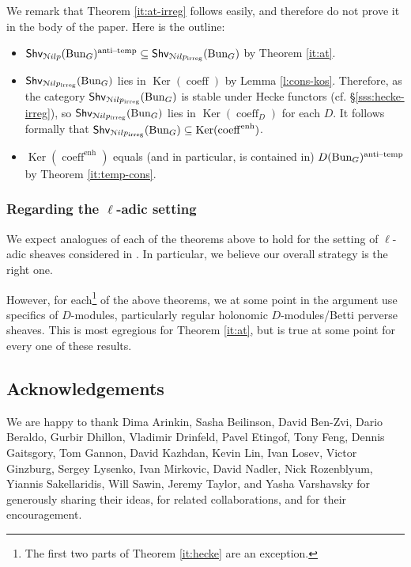 \documentclass[reqno,11pt]{amsart}
\numberwithin{equation}{subsection}
\theoremstyle{remark}
\newcommand{\sN}{{\EuScript N}}
\newcommand{\on}{\operatorname}
\newcommand{\mathendash}{\text{\textendash}}
\newcommand{\Ker}{\on{Ker}}
\newcommand{\Bun}{\on{Bun}}
\renewcommand{\subset}{\subseteq}
\newcommand{\coeff}{\on{coeff}}
\newcommand{\enh}{\on{enh}}
\newcommand{\Shv}{\mathsf{Shv}}
\newcommand{\at}{\on{anti}\!\mathendash\!\on{temp}}
\newcommand{\Nilp}{\sN ilp}
\newcommand{\irreg}{\on{irreg}}
\begin{document}
We remark that Theorem \ref{it:at-irreg} follows easily, and therefore
do not prove it in the body of the paper.
Here is the outline:
%
\begin{itemize}

\item $\Shv_{\Nilp}(\Bun_G)^{\at} \subset \Shv_{\Nilp_{\irreg}}(\Bun_G)$
by Theorem \ref{it:at}.

\item $\Shv_{\Nilp_{\irreg}}(\Bun_G)$ lies in 
$\Ker(\coeff)$ by Lemma \ref{l:cons-kos}.
Therefore, as the category $\Shv_{\Nilp_{\irreg}}(\Bun_G)$ 
is stable under Hecke functors (cf. \S \ref{sss:hecke-irreg}),
so $\Shv_{\Nilp_{\irreg}}(\Bun_G)$ lies in $\Ker(\coeff_D)$ for
each $D$. It follows formally that 
$\Shv_{\Nilp_{\irreg}}(\Bun_G) \subset \Ker(\coeff^{\enh})$. 

\item $\Ker(\coeff^{\enh})$ equals (and in particular, is contained
in) $D(\Bun_G)^{\at}$ by Theorem \ref{it:temp-cons}.

\end{itemize}

\subsubsection{Regarding the $\ell$-adic setting}

We expect analogues of each of the theorems above to hold for
the setting of $\ell$-adic sheaves considered in \cite{agkrrv1}.
In particular, we believe our overall strategy is the right one.

However, for each\footnote{The first two parts of Theorem \ref{it:hecke} are 
an exception.}
of the above theorems, we at some point in the argument use
specifics of $D$-modules, particularly regular holonomic $D$-modules/Betti
perverse sheaves. This is most egregious for Theorem \ref{it:at},
but is true at some point for every one of these results.

\subsection{Acknowledgements}

We are happy to thank Dima Arinkin, Sasha Beilinson, David Ben-Zvi, 
Dario Beraldo, Gurbir Dhillon, Vladimir Drinfeld, 
Pavel Etingof, Tony Feng, Dennis Gaitsgory, Tom Gannon, David Kazhdan, Kevin Lin,
Ivan Losev, Victor Ginzburg,
Sergey Lysenko, Ivan Mirkovic, David Nadler, 
Nick Rozenblyum, Yiannis Sakellaridis, Will Sawin,
Jeremy Taylor, and Yasha Varshavsky
for generously sharing their ideas, for related collaborations, and
for their encouragement.
\end{document}
